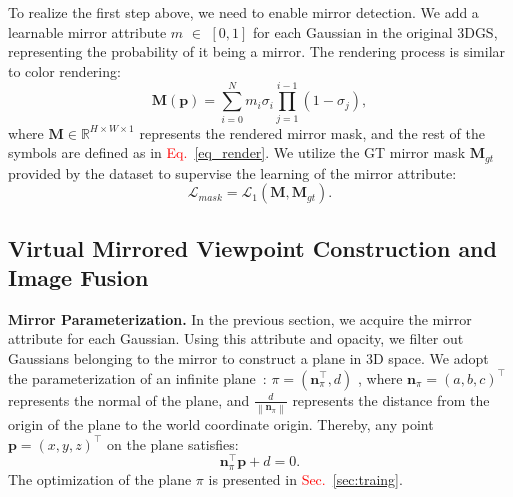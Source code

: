 \documentclass[conference]{IEEEtran}
\begin{document}
To realize the first step above, we need to enable mirror detection. We add a learnable mirror attribute $m$ $\in$ $[0, 1]$ for each Gaussian in the original 3DGS, representing the probability of it being a mirror. The rendering process is similar to color rendering:
\begin{equation}
    {\mathbf{M}(\mathbf{p})}=\sum_{i=0}^{N} m_i \sigma_i\prod_{j=1}^{i-1}\left(1-\sigma_j\right),
    \label{eq:mask_render}
\end{equation}
where  $\mathbf{M}\in \mathbb{R}^{H\times W\times 1}$ represents the rendered mirror mask, and the rest of the symbols are defined as in \textcolor{red}{Eq.~\eqref{eq_render}}. We utilize the GT mirror mask $\mathbf{M}_{gt}$ provided by the dataset to supervise the learning of the mirror attribute:
\begin{equation}
    \mathcal{L}_{mask} = \mathcal{L}_1(\mathbf{M}, \mathbf{M}_{gt}).
    \label{eq:mask_loss}
\end{equation}

\subsection{Virtual Mirrored Viewpoint Construction and Image Fusion}
\label{sec:virtual_view}

\textbf{Mirror Parameterization.} In the previous section, we acquire the mirror attribute for each Gaussian. Using this attribute and opacity, we filter out Gaussians belonging to the mirror to construct a plane in 3D space. We adopt the parameterization of an infinite plane~\cite{kaess2015simultaneous}: $\pi = (\boldsymbol{n}_{\pi}^\top , d)$ , where $\boldsymbol{n}_{\pi}= (a,b,c) ^{\top}$ represents the normal of the plane, and $\frac{d}{\left \| \boldsymbol{n}_{\pi}  \right \| } $ represents the distance from the origin of the plane to the world coordinate origin. Thereby, any point $\boldsymbol{p}  =(x,y,z)^{\top}$ on the plane satisfies: 
\begin{equation}
    \boldsymbol{n}_{\pi}^\top \boldsymbol{p} + d = 0.
\end{equation}
The optimization of the plane $\pi$ is presented in \textcolor{red}{Sec.~\ref{sec:traing}}.
\end{document}
